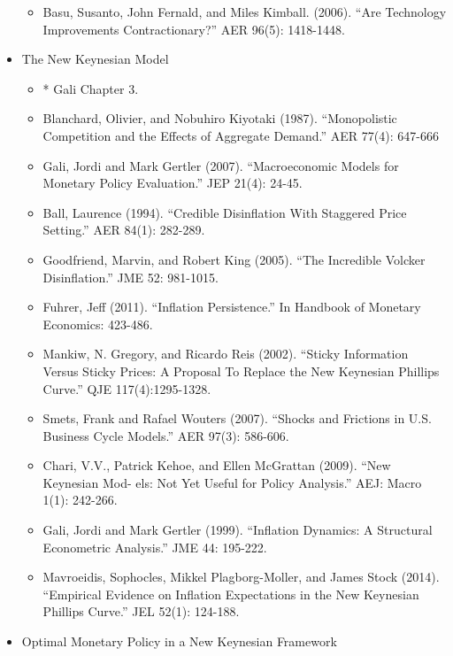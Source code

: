 \documentclass[12pt]{article}
\begin{document}
\begin{itemize}
\begin{itemize}
		\item Basu, Susanto, John Fernald, and Miles Kimball. (2006). ``Are Technology Improvements Contractionary?'' AER 96(5): 1418-1448.
	\end{itemize}
	\item The New Keynesian Model
	\begin{itemize}
		\item* Gali Chapter 3.
		\item Blanchard, Olivier, and Nobuhiro Kiyotaki (1987). ``Monopolistic Competition and the Effects of Aggregate Demand.'' AER 77(4): 647-666
		\item Gali, Jordi and Mark Gertler (2007). ``Macroeconomic Models for Monetary Policy Evaluation.'' JEP 21(4): 24-45.
		\item Ball, Laurence (1994). ``Credible Disinflation With Staggered Price Setting.'' AER 84(1): 282-289.
		\item Goodfriend, Marvin, and Robert King (2005). ``The Incredible Volcker Disinflation.'' JME 52: 981-1015.
		\item Fuhrer, Jeff (2011). ``Inflation Persistence.'' In Handbook of Monetary Economics: 423-486.
		\item Mankiw, N. Gregory, and Ricardo Reis (2002). ``Sticky Information Versus Sticky Prices: A Proposal To Replace the New Keynesian Phillips Curve.'' QJE 117(4):1295-1328.
		\item Smets, Frank and Rafael Wouters (2007). ``Shocks and Frictions in U.S. Business Cycle Models.'' AER 97(3): 586-606.
		\item Chari, V.V., Patrick Kehoe, and Ellen McGrattan (2009). ``New Keynesian Mod- els: Not Yet Useful for Policy Analysis.'' AEJ: Macro 1(1): 242-266.
		\item Gali, Jordi and Mark Gertler (1999). ``Inflation Dynamics: A Structural Econometric Analysis.'' JME 44: 195-222.
		\item Mavroeidis, Sophocles, Mikkel Plagborg-Moller, and James Stock (2014). ``Empirical Evidence on Inflation Expectations in the New Keynesian Phillips Curve.'' JEL 52(1): 124-188.
	\end{itemize}
	\item Optimal Monetary Policy in a New Keynesian Framework

\end{itemize}
\end{document}
